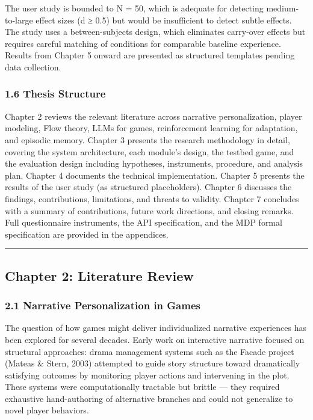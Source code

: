 The user study is bounded to N = 50, which is adequate for detecting
medium-to-large effect sizes (d ≥ 0.5) but would be insufficient to
detect subtle effects. The study uses a between-subjects design, which
eliminates carry-over effects but requires careful matching of
conditions for comparable baseline experience. Results from Chapter 5
onward are presented as structured templates pending data collection.

\subsubsection{1.6 Thesis Structure}\label{thesis-structure}

Chapter 2 reviews the relevant literature across narrative
personalization, player modeling, Flow theory, LLMs for games,
reinforcement learning for adaptation, and episodic memory. Chapter 3
presents the research methodology in detail, covering the system
architecture, each module's design, the testbed game, and the evaluation
design including hypotheses, instruments, procedure, and analysis plan.
Chapter 4 documents the technical implementation. Chapter 5 presents the
results of the user study (as structured placeholders). Chapter 6
discusses the findings, contributions, limitations, and threats to
validity. Chapter 7 concludes with a summary of contributions, future
work directions, and closing remarks. Full questionnaire instruments,
the API specification, and the MDP formal specification are provided in
the appendices.

\begin{center}\rule{0.5\linewidth}{0.5pt}\end{center}

\subsection{Chapter 2: Literature
Review}\label{chapter-2-literature-review}

\subsubsection{2.1 Narrative Personalization in
Games}\label{narrative-personalization-in-games}

The question of how games might deliver individualized narrative
experiences has been explored for several decades. Early work on
interactive narrative focused on structural approaches: drama management
systems such as the Facade project (Mateas \& Stern, 2003) attempted to
guide story structure toward dramatically satisfying outcomes by
monitoring player actions and intervening in the plot. These systems
were computationally tractable but brittle --- they required exhaustive
hand-authoring of alternative branches and could not generalize to novel
player behaviors.

